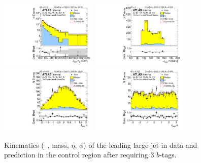 \clearpage

\begin{figure}[htb!]
\begin{center}
\includegraphics[width=0.41\textwidth,angle=-90]{figures/boosted/Control/b77_ThreeTag_Control_leadHCand_Pt_m_1.pdf}
\includegraphics[width=0.41\textwidth,angle=-90]{figures/boosted/Control/b77_ThreeTag_Control_leadHCand_Mass_s.pdf}\\
\includegraphics[width=0.41\textwidth,angle=-90]{figures/boosted/Control/b77_ThreeTag_Control_leadHCand_Eta.pdf}
\includegraphics[width=0.41\textwidth,angle=-90]{figures/boosted/Control/b77_ThreeTag_Control_leadHCand_Phi.pdf}
  \caption{Kinematics (\pt~, mass, $\eta$, $\phi$) of the leading large-\R jet in data and prediction in the control region after requiring 3 $b$-tags. }
  \label{fig:boosted-3b-control-ak10-lead}
\end{center}
\end{figure}

